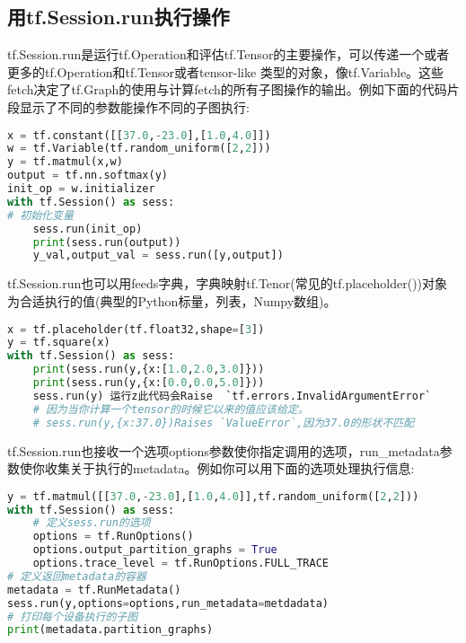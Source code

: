 \subsection{用tf.Session.run执行操作}
tf.Session.run是运行tf.Operation和评估tf.Tensor的主要操作，可以传递一个或者更多的tf.Operation和tf.Tensor或者tensor-like 类型的对象，像tf.Variable。这些fetch决定了tf.Graph的使用与计算fetch的所有子图操作的输出。例如下面的代码片段显示了不同的参数能操作不同的子图执行:
\begin{lstlisting}[language=Python]
x = tf.constant([[37.0,-23.0],[1.0,4.0]])
w = tf.Variable(tf.random_uniform([2,2]))
y = tf.matmul(x,w)
output = tf.nn.softmax(y)
init_op = w.initializer
with tf.Session() as sess:
# 初始化变量
    sess.run(init_op)
    print(sess.run(output))
    y_val,output_val = sess.run([y,output])
\end{lstlisting}
tf.Session.run也可以用feeds字典，字典映射tf.Tenor(常见的tf.placeholder())对象为合适执行的值(典型的Python标量，列表，Numpy数组)。
\begin{lstlisting}[language=Python]
x = tf.placeholder(tf.float32,shape=[3])
y = tf.square(x)
with tf.Session() as sess:
    print(sess.run(y,{x:[1.0,2.0,3.0]}))
    print(sess.run(y,{x:[0.0,0.0,5.0]}))
    sess.run(y) 运行z此代码会Raise  `tf.errors.InvalidArgumentError`
    # 因为当你计算一个tensor的时候它以来的值应该给定。
    # sess.run(y,{x:37.0})Raises `ValueError`,因为37.0的形状不匹配
\end{lstlisting}
tf.Session.run也接收一个选项options参数使你指定调用的选项，run\_metadata参数使你收集关于执行的metadata。例如你可以用下面的选项处理执行信息:
\begin{lstlisting}[language=Python]
y = tf.matmul([[37.0,-23.0],[1.0,4.0]],tf.random_uniform([2,2]))
with tf.Session() as sess:
	# 定义sess.run的选项
    options = tf.RunOptions()
    options.output_partition_graphs = True
    options.trace_level = tf.RunOptions.FULL_TRACE
# 定义返回metadata的容器
metadata = tf.RunMetadata()
sess.run(y,options=options,run_metadata=metdadata)
# 打印每个设备执行的子图
print(metadata.partition_graphs)
\end{lstlisting}
